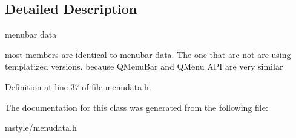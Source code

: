 \subsection{Detailed Description}
menubar data 

most members are identical to menubar data. The one that are not are using templatized versions, because Q\+Menu\+Bar and Q\+Menu A\+PI are very similar 

Definition at line 37 of file menudata.\+h.



The documentation for this class was generated from the following file\+:\begin{DoxyCompactItemize}
\item 
mstyle/menudata.\+h\end{DoxyCompactItemize}
